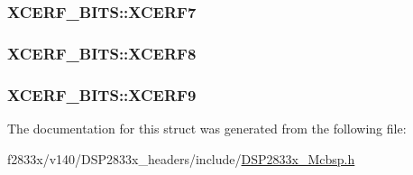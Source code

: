 \subsubsection[{X\+C\+E\+R\+F7}]{ X\+C\+E\+R\+F\+\_\+\+B\+I\+T\+S\+::\+X\+C\+E\+R\+F7}\label{struct_x_c_e_r_f___b_i_t_s_a34cb12f26ffd813af9a9f53e80d709e7}
\hypertarget{struct_x_c_e_r_f___b_i_t_s_a834f2eac63bc87f7f8ce98df9f946d79}{}
\subsubsection[{X\+C\+E\+R\+F8}]{ X\+C\+E\+R\+F\+\_\+\+B\+I\+T\+S\+::\+X\+C\+E\+R\+F8}\label{struct_x_c_e_r_f___b_i_t_s_a834f2eac63bc87f7f8ce98df9f946d79}
\hypertarget{struct_x_c_e_r_f___b_i_t_s_aa80b2676d6f652a460e673f9fe0fa083}{}
\subsubsection[{X\+C\+E\+R\+F9}]{ X\+C\+E\+R\+F\+\_\+\+B\+I\+T\+S\+::\+X\+C\+E\+R\+F9}\label{struct_x_c_e_r_f___b_i_t_s_aa80b2676d6f652a460e673f9fe0fa083}


The documentation for this struct was generated from the following file\+:\begin{DoxyCompactItemize}
\item 
f2833x/v140/\+D\+S\+P2833x\+\_\+headers/include/\hyperlink{_d_s_p2833x___mcbsp_8h}{D\+S\+P2833x\+\_\+\+Mcbsp.\+h}\end{DoxyCompactItemize}
